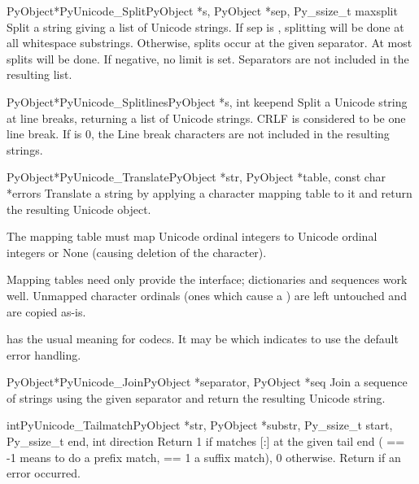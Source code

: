 \begin{cfuncdesc}{PyObject*}{PyUnicode_Split}{PyObject *s,
                                              PyObject *sep,
                                              Py_ssize_t maxsplit}
  Split a string giving a list of Unicode strings.  If sep is \NULL{},
  splitting will be done at all whitespace substrings.  Otherwise,
  splits occur at the given separator.  At most  splits
  will be done.  If negative, no limit is set.  Separators are not
  included in the resulting list.
\end{cfuncdesc}

\begin{cfuncdesc}{PyObject*}{PyUnicode_Splitlines}{PyObject *s,
                                                   int keepend}
  Split a Unicode string at line breaks, returning a list of Unicode
  strings.  CRLF is considered to be one line break.  If 
  is 0, the Line break characters are not included in the resulting
  strings.
\end{cfuncdesc}

\begin{cfuncdesc}{PyObject*}{PyUnicode_Translate}{PyObject *str,
                                                  PyObject *table,
                                                  const char *errors}
  Translate a string by applying a character mapping table to it and
  return the resulting Unicode object.

  The mapping table must map Unicode ordinal integers to Unicode
  ordinal integers or None (causing deletion of the character).

  Mapping tables need only provide the 
  interface; dictionaries and sequences work well.  Unmapped character
  ordinals (ones which cause a ) are left
  untouched and are copied as-is.

   has the usual meaning for codecs. It may be \NULL{}
  which indicates to use the default error handling.
\end{cfuncdesc}

\begin{cfuncdesc}{PyObject*}{PyUnicode_Join}{PyObject *separator,
                                             PyObject *seq}
  Join a sequence of strings using the given separator and return the
  resulting Unicode string.
\end{cfuncdesc}

\begin{cfuncdesc}{int}{PyUnicode_Tailmatch}{PyObject *str,
                                                  PyObject *substr,
                                                  Py_ssize_t start,
                                                  Py_ssize_t end,
                                                  int direction}
  Return 1 if  matches [:] at
  the given tail end ( == -1 means to do a prefix
  match,  == 1 a suffix match), 0 otherwise.
  Return  if an error occurred.
\end{cfuncdesc}

